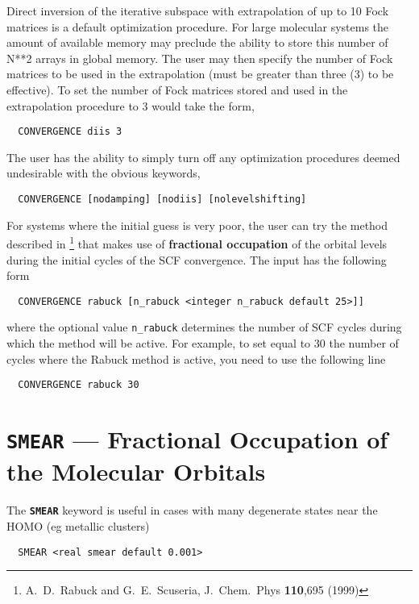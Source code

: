 Direct inversion of the iterative subspace with extrapolation of up to
10 Fock matrices is a default optimization procedure.  For large
molecular systems the amount of available memory may preclude the ability to
store this number of N**2 arrays in global memory.  The user may then
specify the number of Fock matrices to be used in the extrapolation
(must be greater than three (3) to be effective).  To set the number of
Fock matrices stored and used in the extrapolation procedure to 3
would take the form,
\begin{verbatim}
  CONVERGENCE diis 3
\end{verbatim}

The user has the ability to simply turn off any optimization
procedures deemed undesirable with the obvious keywords,
\begin{verbatim}
  CONVERGENCE [nodamping] [nodiis] [nolevelshifting]
\end{verbatim}


For systems where the initial guess is very poor, the user can try the
method described in
\footnote{A.~D.~Rabuck and G.~E.~Scuseria, J.~Chem.~Phys {\bf 110},695
(1999)}
that makes use of {\bf fractional occupation} of the orbital levels during
the initial cycles of the SCF convergence. The input has the following form

\begin{verbatim}
  CONVERGENCE rabuck [n_rabuck <integer n_rabuck default 25>]]
\end{verbatim}

where the optional value {\tt n\_rabuck} determines the number of SCF
cycles during which the method will be active. For example, to
set equal to 30 the number of cycles where the Rabuck method is
active, you need to use the following line
\begin{verbatim}
  CONVERGENCE rabuck 30
\end{verbatim}



\section{{\tt SMEAR} --- Fractional Occupation of the Molecular Orbitals}
\label{smear}

The {\tt \bf SMEAR} keyword is useful in cases with many degenerate states
near the HOMO (eg metallic clusters)

\begin{verbatim}
  SMEAR <real smear default 0.001>
\end{verbatim}

